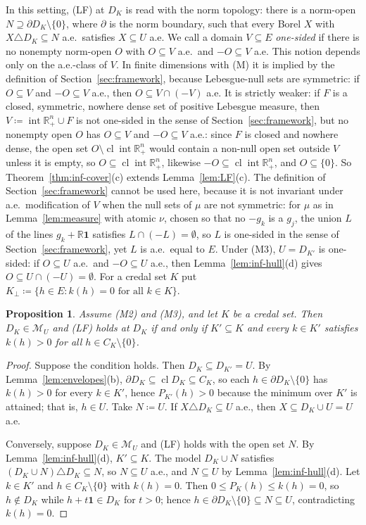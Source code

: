 \documentclass[11pt]{article}
\newcommand{\R}{\mathbb{R}}
\newcommand{\one}{\mathbf{1}}
\newcommand{\M}{\mathcal{M}}
\newcommand{\Rpp}{\inter\R^n_{+}}
\DeclareMathOperator{\cl}{cl}
\DeclareMathOperator{\inter}{int}
\theoremstyle{plain}
\newtheorem{proposition}[theorem]{Proposition}
\theoremstyle{definition}
\theoremstyle{remark}
\begin{document}
In this setting, (LF) at $D_K$ is read with the norm topology: there is a norm-open
$N\supseteq\partial D_K\setminus\{0\}$, where $\partial$ is the norm boundary, such that
every Borel $X$ with $X\triangle D_K\subseteq N$ a.e.\ satisfies $X\subseteq U$ a.e. We
call a domain $V\subseteq E$ \emph{one-sided} if there is no nonempty norm-open $O$ with
$O\subseteq V$ a.e.\ and $-O\subseteq V$ a.e. This notion depends only on the a.e.-class
of $V$. In finite dimensions with (M) it is implied by the definition of
Section~\ref{sec:framework}, because Lebesgue-null sets are symmetric: if $O\subseteq V$ and
$-O\subseteq V$ a.e., then $O\subseteq V\cap(-V)$ a.e. It is strictly weaker: if $F$ is a
closed, symmetric, nowhere dense set of positive Lebesgue measure, then $V\coloneqq\Rpp\cup
F$ is not one-sided in the sense of Section~\ref{sec:framework}, but no nonempty open $O$
has $O\subseteq V$ and $-O\subseteq V$ a.e.: since $F$ is closed and nowhere dense, the
open set $O\setminus\cl\Rpp$ would contain a non-null open set outside $V$ unless it is
empty, so $O\subseteq\cl\Rpp$, likewise $-O\subseteq\cl\Rpp$, and $O\subseteq\{0\}$. So Theorem~\ref{thm:inf-cover}(c) extends Lemma~\ref{lem:LF}(c). The
definition of Section~\ref{sec:framework} cannot be used here, because it is not invariant
under a.e.\ modification of $V$ when the null sets of $\mu$ are not symmetric: for $\mu$ as
in Lemma~\ref{lem:measure} with atomic $\nu$, chosen so that no $-g_k$ is a $g_j$, the union
$L$ of the lines $g_k+\R\one$ satisfies $L\cap(-L)=\emptyset$, so $L$ is one-sided in the
sense of Section~\ref{sec:framework}, yet $L$ is a.e.\ equal to $E$. Under (M3),
$U=D_{K'}$ is one-sided: if $O\subseteq U$ a.e.\ and $-O\subseteq U$ a.e., then
Lemma~\ref{lem:inf-hull}(d) gives $O\subseteq U\cap(-U)=\emptyset$. For a credal set $K$
put $K_\perp\coloneqq\{h\in E:k(h)=0\text{ for all }k\in K\}$.

\begin{proposition}\label{prop:inf-LF}
Assume (M2) and (M3), and let $K$ be a credal set. Then $D_K\in\M_U$ and (LF) holds at
$D_K$ if and only if $K'\subseteq K$ and every $k\in K'$ satisfies $k(h)>0$ for all $h\in
C_K\setminus\{0\}$.
\end{proposition}

\begin{proof}
Suppose the condition holds. Then $D_K\subseteq D_{K'}=U$. By
Lemma~\ref{lem:envelopes}(b), $\partial D_K\subseteq\cl D_K\subseteq C_K$, so each $h\in
\partial D_K\setminus\{0\}$ has $k(h)>0$ for every $k\in K'$, hence $P_{K'}(h)>0$ because
the minimum over $K'$ is attained; that is, $h\in U$. Take $N\coloneqq U$. If $X\triangle
D_K\subseteq U$ a.e., then $X\subseteq D_K\cup U=U$ a.e.

Conversely, suppose $D_K\in\M_U$ and (LF) holds with the open set $N$. By
Lemma~\ref{lem:inf-hull}(d), $K'\subseteq K$. The model $D_K\cup N$ satisfies $(D_K\cup N)
\triangle D_K\subseteq N$, so $N\subseteq U$ a.e., and $N\subseteq U$ by
Lemma~\ref{lem:inf-hull}(d). Let $k\in K'$ and $h\in C_K\setminus\{0\}$ with $k(h)=0$.
Then $0\le P_K(h)\le k(h)=0$, so $h\notin D_K$ while $h+t\one\in D_K$ for $t>0$; hence $h\in
\partial D_K\setminus\{0\}\subseteq N\subseteq U$, contradicting $k(h)=0$.
\end{proof}
\end{document}
